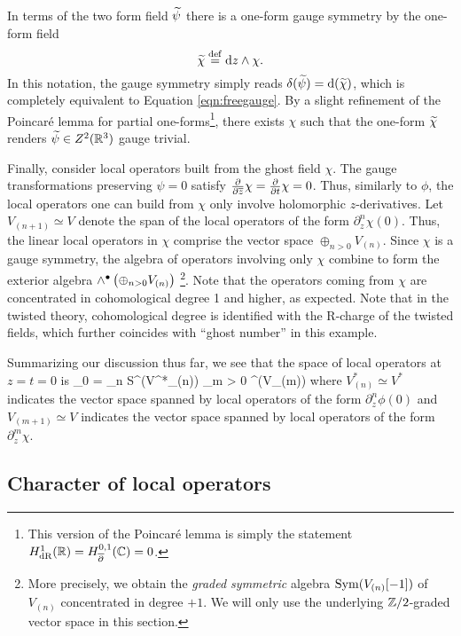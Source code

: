 \documentclass[11pt]{amsart}
\begin{document}
In terms of the two form field $\widetilde \psi$ there is a one-form gauge symmetry by the one-form field 
\[
\widetilde \chi \overset{\rm def}{=} {\rm d} z \wedge \chi .
\]
In this notation, the gauge symmetry simply reads $\delta (\widetilde \psi) = {\rm d} (\widetilde \chi)$, which is completely equivalent to Equation \eqref{eqn:freegauge}.
By a slight refinement of the Poincar\'{e} lemma for partial one-forms\footnote{This version of the Poincar\'{e} lemma is simply the statement $H^1_{\rm dR} (\mathbb R) = H_{\overline{\partial}}^{0,1}(\mathbb C)= 0$.}, there exists $\chi$ such that the one-form $\widetilde \chi$ renders $\widetilde \psi \in Z^2(\mathbb R^3)$ gauge trivial. 


Finally, consider local operators built from the ghost field $\chi$. 
The gauge transformations preserving $\psi = 0$ satisfy $\frac{\partial}{\partial {\overline{z}}} \chi = \frac{\partial}{\partial t} \chi = 0$. 
Thus, similarly to $\phi$, the local operators one can build from $\chi$ only involve holomorphic $z$-derivatives. 
Let $V_{(n+1)} \simeq V$ denote the span of the local operators of the form $\partial_z^n \chi(0)$.
Thus, the linear local operators in $\chi$ comprise the vector space $\oplus_{n > 0} V_{(n)}$.
Since $\chi$ is a gauge symmetry, the algebra of operators involving only $\chi$ combine to form the exterior algebra $\wedge^\bullet \left(\oplus_{n > 0} V_{(n)}\right)$ \footnote{More precisely, we obtain the {\em graded symmetric} algebra $\operatorname{Sym}(V_{(n)}[-1])$ of $V_{(n)}$ concentrated in degree $+1$.
We will only use the underlying $\mathbb Z/2$-graded vector space in this section.}. Note that the operators coming from $\chi$ are concentrated in cohomological degree 1 and higher, as expected. Note that in the twisted theory, cohomological degree is identified with the R-charge of the twisted fields, which further coincides with ``ghost number'' in this example. 

Summarizing our discussion thus far, we see that the space of local operators at $z=t=0$ is
\beqn\label{eqn:freeops}
\cA_0 = \bigotimes_{n } {\rm S}^\bu \big(V^*_{(n)}\big) \otimes \bigotimes_{m > 0} \wedge^\bu \big(V_{(m)}\big)
\eeqn
where $V_{(n)}^* \simeq V^*$ indicates the vector space spanned by local operators of the form $\partial^n_{z} \phi(0)$ and $V_{(m+1)} \simeq V$ indicates the vector space spanned by local operators of the form $\partial^{m}_z \chi$. 


\subsection{Character of local operators}
\end{document}
